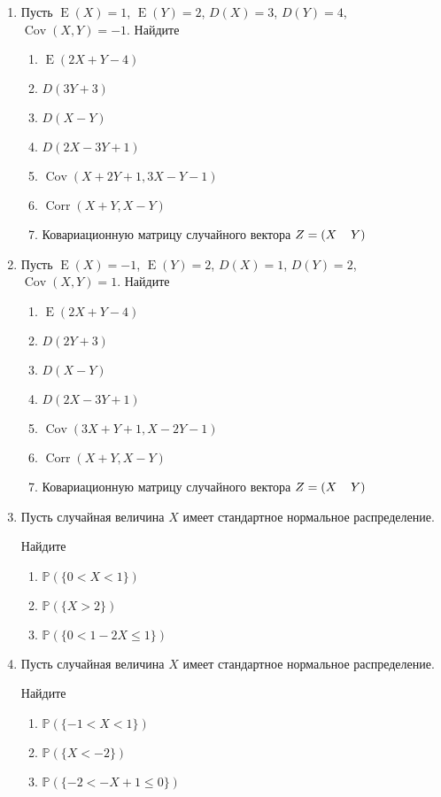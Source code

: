 \documentclass[12pt]{article}
\DeclareMathOperator{\Cov}{Cov}
\DeclareMathOperator{\Corr}{Corr}
\DeclareMathOperator{\E}{E}
\def \P{\mathbb{P}}
\begin{document}
\begin{enumerate}
\item Пусть $\E(X)=1$, $\E(Y)=2$, $D(X) = 3$, $D(Y) = 4$, $\Cov(X,Y) = -1$. Найдите
\begin{enumerate}
\item $\E(2X + Y - 4)$  
\item $D(3Y + 3)$  
\item $D(X - Y)$  
\item $D(2X - 3Y +1)$  
\item $\Cov(X+ 2Y + 1,3X - Y -1)$  
\item $\Corr(X + Y, X - Y)$  
\item Ковариационную матрицу случайного вектора $Z = (X\hspace*{0.4cm} Y)$ \end{enumerate}


\item Пусть $\E(X)=-1$, $\E(Y)=2$, $D(X) = 1$, $D(Y) = 2$, $\Cov(X,Y) = 1$. Найдите 
\begin{enumerate}
\item $\E(2X + Y - 4)$  
\item $D(2Y + 3)$  
\item $D(X - Y)$  
\item $D(2X - 3Y +1)$  
\item $\Cov(3X+ Y + 1,X - 2Y -1)$  
\item $\Corr(X + Y, X - Y)$  
\item Ковариационную матрицу случайного вектора $Z = (X\hspace*{0.4cm}Y)$  
\end{enumerate}

\item Пусть случайная величина $X$ имеет стандартное нормальное распределение. 

Найдите  
\begin{enumerate}
\item $\P(\{0 < X < 1\})$  
\item $\P(\{X > 2\})$  
\item $\P(\{0 < 1 - 2X \leq 1\})$  
\end{enumerate}

\item Пусть случайная величина $X$ имеет стандартное нормальное распределение. 

Найдите
\begin{enumerate}
\item $\P(\{-1 < X < 1\})$  
\item $\P(\{X < -2\})$  
\item $\P(\{-2 < -X + 1 \leq 0\})$  
\end{enumerate}


\end{enumerate}
\end{document}
